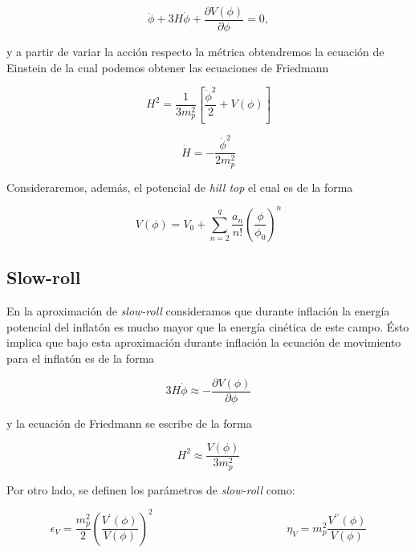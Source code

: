 \begin{equation}
    \ddot{\phi} + 3 H \dot{\phi} + \frac{\partial V(\phi)}{\partial \phi} = 0,
\end{equation}

\noindent 
y a partir de variar la acción respecto la métrica obtendremos la ecuación de Einstein de la cual podemos obtener las ecuaciones de Friedmann

\begin{equation}
    H^2 = \frac{1}{3 m_p^2} \left[ \frac{\ddot{\phi}^2}{2} + V(\phi) \right]
\end{equation}

\begin{equation}
    \dot{H} = - \frac{\dot{\phi}^2}{2 m^2_p}
\end{equation}

Consideraremos, además, el potencial de \textit{hill top} el cual es de la forma

\begin{equation}
    V(\phi) = V_0 + \sum_{n = 2}^{q} \frac{a_n}{n!} \left( \frac{\phi}{\phi_0} \right)^n
\end{equation}

\subsection{Slow-roll}

En la aproximación de \textit{slow-roll} consideramos que durante inflación la energía potencial del inflatón es mucho mayor que la energía cinética de este campo. Ésto implica que bajo esta aproximación durante inflación la ecuación de movimiento para el inflatón es de la forma

\begin{equation}
    3 H \dot{\phi} \approx - \frac{\partial V(\phi)}{\partial \phi}
\end{equation}

\noindent
y la ecuación de Friedmann se escribe de la forma

\begin{equation}
    H^2 \approx \frac{V(\phi)}{3 m_p^2}
\end{equation}

Por otro lado, se definen los parámetros de \textit{slow-roll} como:

\begin{equation}
    \epsilon_V = \frac{m_p^2}{2} \left( \frac{V^\prime (\phi)}{V (\phi)} \right)^2 \hspace{5cm} \eta_V = m_p^2 \frac{V^{\prime \prime} (\phi)}{V (\phi)}
\end{equation}

